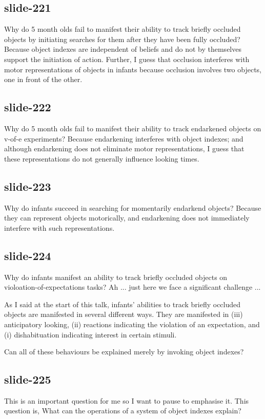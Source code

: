 \documentclass[12pt,\papersize]{extarticle}
\begin{document}
\subsection{slide-221}
Why do 5 month olds fail to manifest their ability to track briefly
occluded objects by initiating searches for them after they have been
fully occluded?  Because object indexes are independent of beliefs
and do not by themselves support the initiation of action.
Further, I guess that occlusion interferes
with motor representations  of objects in infants because occlusion
involves two objects, one in front of the other.

\subsection{slide-222}
Why do 5 month olds fail to manifest their ability to track endarkened
objects on v-of-e experiments?  Because endarkening interferes with object
indexes; and although endarkening does not eliminate motor representations,
I guess that these representations do not generally influence looking times.

\subsection{slide-223}
Why do infants succeed in searching for momentarily endarkend objects?
Because they can represent objects motorically, and endarkening does
not immediately interfere with such representations.

\subsection{slide-224}
Why do infants manifest an ability to track briefly occluded objects on
violoation-of-expectations tasks?
Ah ... just here we face a significant challenge ...

As I said at the start of this talk, infants’ abilities to track briefly
occluded objects are manifested in several different ways.
They are manifested in (iii) anticipatory looking, (ii) reactions
indicating the violation of an expectation, and (i) dishabituation
indicating interest in certain stimuli.

Can all of these behaviours be explained merely by invoking object
indexes?

\subsection{slide-225}
This is an important question for me so I want to pause to emphasise it.
This question is, What can the operations of a system of
object indexes explain?
\end{document}
